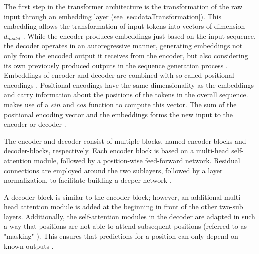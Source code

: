 The first step in the transformer architecture is the transformation of the raw input through an embedding layer (see \autoref{sec:dataTransformation}).
This embedding allows the transformation of input tokens into vectors of dimension $d_{model}$ \cite{vaswani2017AttentionAllYou}.
While the encoder produces embeddings just based on the input sequence, the decoder operates in an autoregressive manner, generating embeddings not only from the encoded output it receives from the encoder, but also considering its own previously produced outputs in the sequence generation process \cite{vaswani2017AttentionAllYou}.
Embeddings of encoder and decoder are combined with so-called positional encodings \cite{vaswani2017AttentionAllYou, lin2022SurveyTransformers}.
Positional encodings have the same dimensionality as the embeddings and carry information about the positions of the tokens in the overall sequence.
\cite{vaswani2017AttentionAllYou} makes use of a $sin$ and $cos$ function to compute this vector.
The sum of the positional encoding vector and the embeddings forms the new input to the encoder or decoder \cite{vaswani2017AttentionAllYou}.

The encoder and decoder consist of multiple blocks, named encoder-blocks and decoder-blocks, respectively.
Each encoder block is based on a multi-head self-attention module, followed by a position-wise feed-forward network.
Residual connections are employed around the two sublayers, followed by a layer normalization, to facilitate building a deeper network \cite{vaswani2017AttentionAllYou, lin2022SurveyTransformers}.

A decoder block is similar to the encoder block; however, an additional multi-head attention module is added at the beginning in front of the other two-sub layers.
Additionally, the self-attention modules in the decoder are adapted in such a way that positions are not able to attend subsequent positions (referred to as "masking" \cite[p. 3]{vaswani2017AttentionAllYou}).
This ensures that predictions for a position can only depend on known outputs \cite{vaswani2017AttentionAllYou, lin2022SurveyTransformers}.

